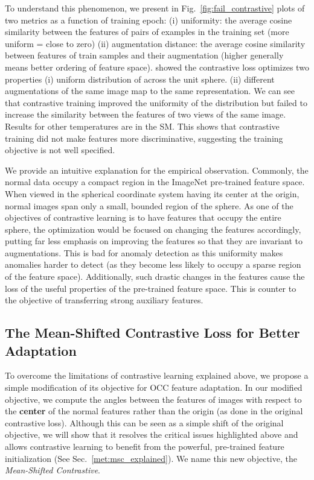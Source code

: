 \documentclass[letterpaper]{article} \usepackage{aaai23}  \usepackage{times}  \usepackage{helvet}  \usepackage{courier}  \usepackage[hyphens]{url}  \usepackage{graphicx} \usepackage{amsmath, amssymb}
\begin{document}
To understand this phenomenon, we present in Fig.~\ref{fig:fail_contrastive} plots of two metrics as a function of training epoch: (i) uniformity: the average cosine similarity between the features of pairs of examples in the training set (more uniform = close to zero)  (ii) augmentation distance:  the average cosine similarity between features of train samples and their augmentation (higher generally means better ordering of feature space). \cite{wang2020understanding} showed the contrastive loss optimizes two properties (i) uniform distribution of  across the unit sphere. (ii) different augmentations of the same image map to the same representation. We can see that contrastive training improved the uniformity of the distribution but failed to increase the similarity between the features of two views of the same image. Results for other temperatures are in the SM. This shows that contrastive training did not make features more discriminative, suggesting the training objective is not well specified.

We provide an intuitive explanation for the empirical observation. Commonly, the normal data occupy a compact region in the ImageNet pre-trained feature space. When viewed in the spherical coordinate system having its center at the origin, normal images span only a small, bounded region of the sphere. As one of the objectives of contrastive learning is to have features that occupy the entire sphere, the optimization would be focused on changing the features accordingly, putting far less emphasis on improving the features so that they are invariant to augmentations. This is bad for anomaly detection as this uniformity makes anomalies harder to detect (as they become less likely to occupy a sparse region of the feature space). Additionally, such drastic changes in the features cause the loss of the useful properties of the pre-trained feature space. This is counter to the objective of transferring strong auxiliary features.

\subsection{The Mean-Shifted Contrastive Loss for Better Adaptation}
\label{met:approach}

To overcome the limitations of contrastive learning explained above, we propose a simple modification of its objective for OCC feature adaptation. In our modified objective, we compute the angles between the features of images with respect to the \textbf{center} of the normal features rather than the origin (as done in the original contrastive loss). Although this can be seen as a simple shift of the original objective, we will show that it resolves the critical issues highlighted above and allows contrastive learning to benefit from the powerful, pre-trained feature initialization (See Sec.~\ref{met:msc_explained}). We name this new objective, the \textit{Mean-Shifted Contrastive}. 
\end{document}
